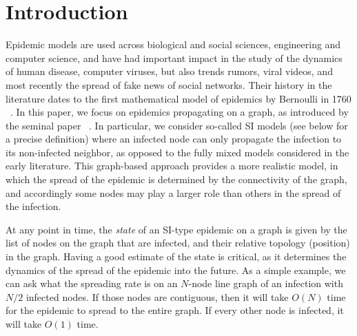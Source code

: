 \section{Introduction}
\label{sec:intro}

Epidemic models are used across biological and social sciences, engineering and computer science, and have had important impact in the study of the dynamics of human disease, computer viruses, but also trends rumors, viral videos, and most recently the spread of fake news of social networks. Their history in the literature dates to the first mathematical model of epidemics by Bernoulli in 1760 ~\cite{Bernoulli2004}.
In this paper, we focus on epidemics propagating on a graph, as introduced by the seminal paper ~\cite{Newman2002}. In particular, we consider so-called SI models (see below for a precise definition) where an infected node can only propagate the infection to its non-infected neighbor, as opposed to the fully mixed models considered in the early literature. This graph-based approach provides a more realistic model, in which the spread of the epidemic is determined by the connectivity of the graph, and accordingly some nodes may play a larger role than others in the spread of the infection.  

At any point in time, the {\em state} of an SI-type epidemic on a graph is given by the list of nodes on the graph that are infected, and their relative topology (position) in the graph. Having a good estimate of the state is critical, as it determines the dynamics of the spread of the epidemic into the future. As a simple example, we can ask what the spreading rate is on an $N$-node line graph of an infection with $N/2$ infected nodes. If those nodes are contiguous, then it will take $O(N)$ time for the epidemic to spread to the entire graph. If every other node is infected, it will take $O(1)$ time. 

